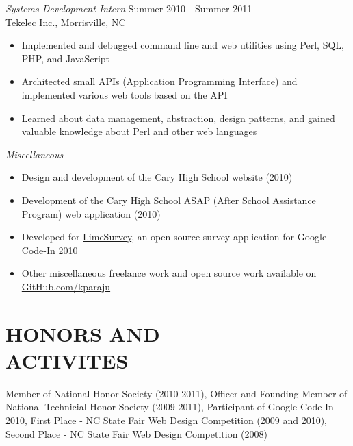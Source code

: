 \documentclass[margin]{res}
\begin{document}
\begin{resume}
                {\sl Systems Development Intern} \hfill Summer 2010 - Summer 2011 \\
                Tekelec Inc., Morrisville, NC
                \begin{itemize}  \itemsep -2pt %
                \item 
                  Implemented and debugged command line and web utilities using Perl, SQL, PHP, and JavaScript
                \item
                  Architected small APIs (Application Programming Interface) and implemented various web tools based on the API
                \item
                  Learned about data management, abstraction, design patterns, and gained valuable 
                  knowledge about Perl and other web languages
                \end{itemize}

                {\sl Miscellaneous }
                \begin{itemize}  \itemsep -2pt %
                \item 
                  Design and development of the \href{http://caryhs.wcpss.net/}{Cary High School website} (2010)
                \item
                  Development of the Cary High School ASAP (After School Assistance Program) web application (2010)
                \item
                  Developed for \href{http://www.limesurvey.org/}{LimeSurvey}, an open source survey application for Google Code-In 2010
                \item
                  Other miscellaneous freelance work and open source work available on \\
                  \href{https://github.com/kparaju}{GitHub.com/kparaju} 
                \end{itemize}


\section{HONORS AND \\ ACTIVITES}
            Member of National Honor Society (2010-2011),
            Officer and Founding Member of National Technicial Honor Society (2009-2011),
            Participant of Google Code-In 2010, 
            First Place - NC State Fair Web Design Competition (2009 and 2010),
            Second Place - NC State Fair Web Design Competition (2008)
 
\end{resume}
\end{document}
